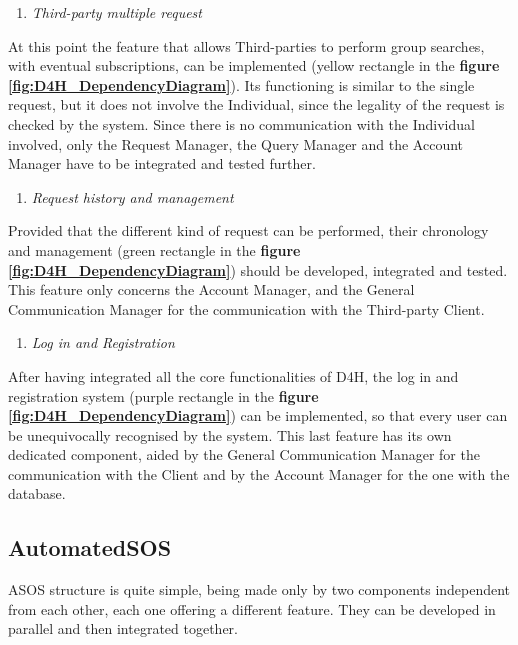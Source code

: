     \begin{enumerate} [resume]
        \item \emph{Third-party multiple request}
    \end{enumerate}
    At this point the feature that allows Third-parties to perform group searches, with eventual subscriptions, can be implemented (yellow rectangle in the \textbf{figure \ref{fig:D4H_DependencyDiagram}}). Its functioning is similar to the single request, but it does not involve the Individual, since the legality of the request is checked by the system. Since there is no communication with the Individual involved, only the Request Manager, the Query Manager and the Account Manager have to be integrated and tested further. \\
    
    \begin{enumerate} [resume]
        \item \emph{Request history and management}
    \end{enumerate}
    Provided that the different kind of request can be performed, their chronology and management (green rectangle in the \textbf{figure \ref{fig:D4H_DependencyDiagram}}) should be developed, integrated and tested. This feature only concerns the Account Manager, and the General Communication Manager for the communication with the Third-party Client.
    
    \begin{enumerate} [resume]
        \item \emph{Log in and Registration}
    \end{enumerate}
    After having integrated all the core functionalities of D4H, the log in and registration system (purple rectangle in the \textbf{figure \ref{fig:D4H_DependencyDiagram}}) can be implemented, so that every user can be unequivocally recognised by the system. This last feature has its own dedicated component, aided by the General Communication Manager for the communication with the Client and by the Account Manager for the one with the database.

\subsection{AutomatedSOS}
    ASOS structure is quite simple, being made only by two components independent from each other, each one offering a different feature. They can be developed in parallel and then integrated together.
    
